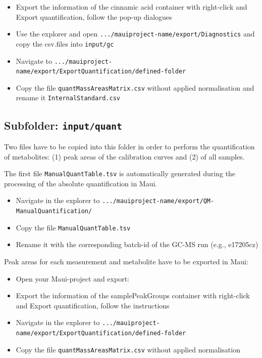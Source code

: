 \documentclass[]{book}
\providecommand{\tightlist}{%
  \setlength{\itemsep}{0pt}\setlength{\parskip}{0pt}}
\theoremstyle{definition}
\theoremstyle{definition}
\theoremstyle{definition}
\theoremstyle{remark}
\begin{document}
\begin{itemize}
\tightlist
\item
  Export the information of the cinnamic acid container with right-click
  and Export quantification, follow the pop-up dialogues
\item
  Use the explorer and open
  \texttt{.../mauiproject-name/export/Diagnostics} and copy the
  csv.files into \texttt{input/gc}
\item
  Navigate to
  \texttt{.../mauiproject-name/export/ExportQuantification/defined-folder}
\item
  Copy the file \texttt{quantMassAreasMatrix.csv} without applied
  normalisation and rename it \texttt{InternalStandard.csv}
\end{itemize}

\subsection{\texorpdfstring{Subfolder:
\texttt{input/quant}}{Subfolder: input/quant}}\label{subfolder-inputquant}

Two files have to be copied into this folder in order to perform the
quantification of metabolites: (1) peak areas of the calibration curves
and (2) of all samples.

The first file \texttt{ManualQuantTable.tsv} is automatically generated
during the processing of the absolute quantification in Maui.

\begin{itemize}
\tightlist
\item
  Navigate in the explorer to
  \texttt{.../mauiproject-name/export/QM-ManualQuantification/}
\item
  Copy the file \texttt{ManualQuantTable.tsv}
\item
  Rename it with the corresponding batch-id of the GC-MS run (e.g.,
  e17205cz)
\end{itemize}

Peak areas for each measurement and metabolite have to be exported in
Maui:

\begin{itemize}
\tightlist
\item
  Open your Maui-project and export:
\item
  Export the information of the samplePeakGroups container with
  right-click and Export quantification, follow the instructions
\item
  Navigate in the explorer to
  \texttt{.../mauiproject-name/export/ExportQuantification/defined-folder}
\item
  Copy the file \texttt{quantMassAreasMatrix.csv} without applied
  normalisation
\end{itemize}
\end{document}
